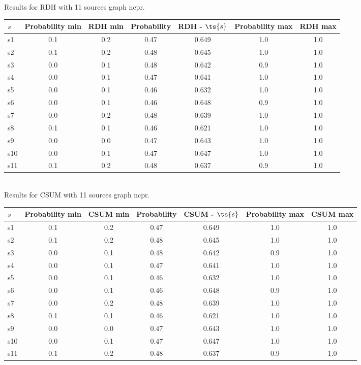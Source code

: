 \documentclass{article}
\begin{document}
\noindent Results for RDH with 11 sources graph ncpr.

\noindent\begin{tabular}{|l|c|c|c|c|c|c|}
\hline
$s$& Probability min & RDH min & Probability & RDH - $\ts{s}$ & Probability max & RDH max\\
\hline
s1 &0.1 & 0.2 & 0.47 & 0.649 & 1.0 & 1.0\\
\hline
s2 &0.1 & 0.2 & 0.48 & 0.645 & 1.0 & 1.0\\
\hline
s3 &0.0 & 0.1 & 0.48 & 0.642 & 0.9 & 1.0\\
\hline
s4 &0.0 & 0.1 & 0.47 & 0.641 & 1.0 & 1.0\\
\hline
s5 &0.0 & 0.1 & 0.46 & 0.632 & 1.0 & 1.0\\
\hline
s6 &0.0 & 0.1 & 0.46 & 0.648 & 0.9 & 1.0\\
\hline
s7 &0.0 & 0.2 & 0.48 & 0.639 & 1.0 & 1.0\\
\hline
s8 &0.1 & 0.1 & 0.46 & 0.621 & 1.0 & 1.0\\
\hline
s9 &0.0 & 0.0 & 0.47 & 0.643 & 1.0 & 1.0\\
\hline
s10 &0.0 & 0.1 & 0.47 & 0.647 & 1.0 & 1.0\\
\hline
s11 &0.1 & 0.2 & 0.48 & 0.637 & 0.9 & 1.0\\
\hline
\end{tabular}\\

\noindent Results for CSUM with 11 sources graph ncpr.

\noindent\begin{tabular}{|l|c|c|c|c|c|c|}
\hline
$s$& Probability min & CSUM min & Probability & CSUM - $\ts{s}$ & Probability max & CSUM max\\
\hline
s1 &0.1 & 0.2 & 0.47 & 0.649 & 1.0 & 1.0\\
\hline
s2 &0.1 & 0.2 & 0.48 & 0.645 & 1.0 & 1.0\\
\hline
s3 &0.0 & 0.1 & 0.48 & 0.642 & 0.9 & 1.0\\
\hline
s4 &0.0 & 0.1 & 0.47 & 0.641 & 1.0 & 1.0\\
\hline
s5 &0.0 & 0.1 & 0.46 & 0.632 & 1.0 & 1.0\\
\hline
s6 &0.0 & 0.1 & 0.46 & 0.648 & 0.9 & 1.0\\
\hline
s7 &0.0 & 0.2 & 0.48 & 0.639 & 1.0 & 1.0\\
\hline
s8 &0.1 & 0.1 & 0.46 & 0.621 & 1.0 & 1.0\\
\hline
s9 &0.0 & 0.0 & 0.47 & 0.643 & 1.0 & 1.0\\
\hline
s10 &0.0 & 0.1 & 0.47 & 0.647 & 1.0 & 1.0\\
\hline
s11 &0.1 & 0.2 & 0.48 & 0.637 & 0.9 & 1.0\\
\hline
\end{tabular}\\
\end{document}
